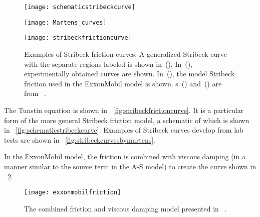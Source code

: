 \begin{figure}
	\begin{minipage}[t]{\linewidth}
		\begin{minipage}[t]{0.32\linewidth}
			\centering
			\texttt{[image: schematicstribeckcurve]}
			\label{fig:schematicstribeckcurve}
		\end{minipage}
		\hfill
		\begin{minipage}[t]{0.32\linewidth}
			\centering
			\texttt{[image: Martens\_curves]}
			\label{fig:stribeckcurvesbymartens}
		\end{minipage}
		\hfill
		\begin{minipage}[t]{0.32\linewidth}
			\centering
			\texttt{[image: stribeckfrictioncurve]}
            \label{fig:stribeckfrictioncurve}
		\end{minipage}
	\end{minipage}
	\caption[Examples of Stribeck friction curves]{Examples of Stribeck friction curves.  A generalized Stribeck curve with the separate regions labeled is shown in~().  In~(), experimentally obtained curves are shown.  In~(), the model Stribeck friction used in the ExxonMobil model is shown.  \figurename{}s~() and~() are from ~\cite{ref:martens2023a}.}
	\label{fig:stribeckfrictioncurveexamples}
\end{figure}
The Tunstin equation is shown in \figurename~\ref{fig:stribeckfrictioncurve}.  It is a particular form of the more general Stribeck friction model, a schematic of which is shown in \figurename~\ref{fig:schematicstribeckcurve}.  Examples of Stribeck curves develop from lab tests are shown in \figurename~\ref{fig:stribeckcurvesbymartens}.

In the ExxonMobil model, the friction is combined with viscous damping (in a manner similar to the source term in the A-S model) to create the curve shown in \figurename~\ref{fig:exxonmobilfriction}.
\begin{figure}
	\centering
	\texttt{[image: exxonmobilfriction]}
	\caption[Comparison of friction models]{The combined friction and viscous damping model presented in ~\cite{ref:dixit2021a}.}
	\label{fig:exxonmobilfriction}
\end{figure}





